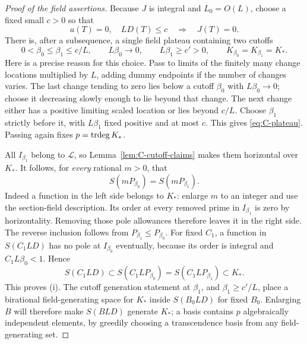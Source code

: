 \begin{proof}[Proof of the field assertions]
Because $J$ is integral and $L_0=O(L)$, choose a fixed small $c>0$ so
that
\[
                  a(T)=0,\quad LD(T)\leq c
                            \quad\Longrightarrow\quad J(T)=0.
\]
There is, after a subsequence, a single field plateau containing two
cutoffs
\begin{equation}\label{eq:C-plateau}
 0<\beta_0\leq\beta_1\leq c/L,\qquad
 L\beta_0\longrightarrow0,\qquad L\beta_1\geq c'>0,\qquad
                         K_{\beta_0}=K_{\beta_1}=K_*.
\end{equation}
Here is a precise reason for this choice.  Pass to limits of the finitely
many change locations multiplied by $L$, adding dummy endpoints if the
number of changes varies.  The last change tending to zero lies below
a cutoff $\beta_0$ with $L\beta_0\to0$; choose it decreasing slowly
enough to lie beyond that change.  The next change either has a positive
limiting scaled location or lies beyond $c/L$.  Choose $\beta_1$
strictly before it, with $L\beta_1$ fixed positive and at most $c$.
This gives \eqref{eq:C-plateau}.  Passing again fixes $p=\operatorname{trdeg} K_*$.

All $I_{\beta_1}$ belong to $\mathcal L$, so
Lemma~\ref{lem:C-cutoff-claims} makes them horizontal over $K_*$.
It follows, for \emph{every} rational $m>0$, that
\begin{equation}\label{eq:C-exact-plateau-spaces}
                   S(mP_{\beta_0})=S(mP_{\beta_1}).
\end{equation}
Indeed a function in the left side belongs to $K_*$: enlarge $m$ to
an integer and use the section-field description.  Its order at every
removed prime in $I_{\beta_1}$ is zero by horizontality.  Removing
those pole allowances therefore leaves it in the right side.  The
reverse inclusion follows from $P_{\beta_1}\leq P_{\beta_0}$.
For fixed $C_1$, a function in $S(C_1LD)$ has no pole at
$I_{\beta_0}$ eventually, because its order is integral and
$C_1L\beta_0<1$.  Hence
\[
          S(C_1LD)\subset S(C_1LP_{\beta_0})
                       =S(C_1LP_{\beta_1})\subset K_*.
\]
This proves (i).  The cutoff generation statement at $\beta_1$, and
$\beta_1\geq c'/L$, place a birational field-generating space for
$K_*$ inside $S(B_0LD)$ for fixed $B_0$.  Enlarging $B$ will therefore
make $S(BLD)$ generate $K_*$; a basis contains $p$ algebraically
independent elements, by greedily choosing a transcendence basis from
any field-generating set.


\end{proof}
